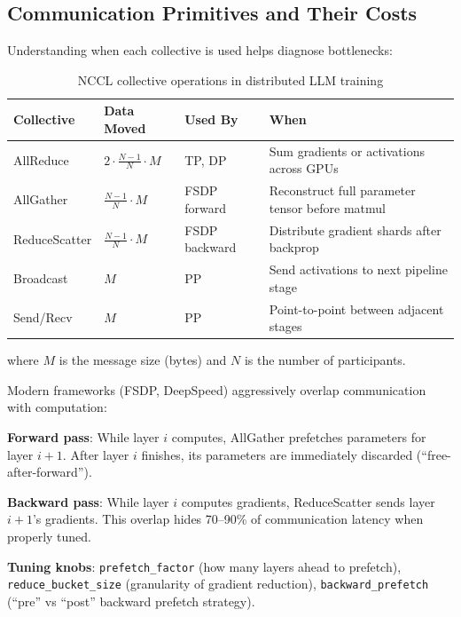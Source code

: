 \subsection{Communication Primitives and Their Costs}
\label{communication-primitives-and-their-costs}

Understanding when each collective is used helps diagnose bottlenecks:

\begin{table}[ht!]
\centering
\caption{NCCL collective operations in distributed LLM training}
\begin{tabular}{@{}lp{3.5cm}p{3.5cm}p{6cm}@{}}
\toprule
\textbf{Collective} & \textbf{Data Moved} & \textbf{Used By} & \textbf{When} \\
\midrule
AllReduce & $2 \cdot \frac{N-1}{N} \cdot M$ & TP, DP & Sum gradients or activations across GPUs \\
AllGather & $\frac{N-1}{N} \cdot M$ & FSDP forward & Reconstruct full parameter tensor before matmul \\
ReduceScatter & $\frac{N-1}{N} \cdot M$ & FSDP backward & Distribute gradient shards after backprop \\
Broadcast & $M$ & PP & Send activations to next pipeline stage \\
Send/Recv & $M$ & PP & Point-to-point between adjacent stages \\
\bottomrule
\end{tabular}
\end{table}

where $M$ is the message size (bytes) and $N$ is the number of participants.

\newpage
\begin{intuitionbox}
Modern frameworks (FSDP, DeepSpeed) aggressively overlap communication with computation:

\textbf{Forward pass}: While layer $i$ computes, AllGather prefetches parameters for layer $i+1$. After layer $i$ finishes, its parameters are immediately discarded (``free-after-forward'').

\textbf{Backward pass}: While layer $i$ computes gradients, ReduceScatter sends layer $i+1$’s gradients. This overlap hides 70--90\% of communication latency when properly tuned.

\textbf{Tuning knobs}: \texttt{prefetch\_factor} (how many layers ahead to prefetch), \texttt{reduce\_bucket\_size} (granularity of gradient reduction), \texttt{backward\_prefetch} (``pre'' vs ``post'' backward prefetch strategy).
\end{intuitionbox}

